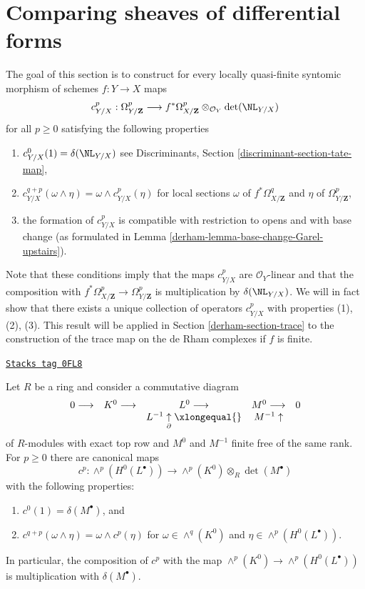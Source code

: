 \section{Comparing sheaves of differential forms}
\label{derham-section-quasi-finite-syntomic}
The goal of this section is to construct for every locally quasi-finite
syntomic morphism of schemes $f : Y \to X$ maps
$$
c^p_{Y/X} :
\Omega^p_{Y/\mathbf{Z}}
\longrightarrow
f^*\Omega^p_{X/\mathbf{Z}} \otimes_{\mathcal{O}_Y} \det(\NL_{Y/X})
$$
for all $p \geq 0$ satisfying the following properties
\begin{enumerate}
\item
\label{derham-item-degree-zero}
$c_{Y/X}^0(1) = \delta(\NL_{Y/X})$ see
Discriminants, Section \ref{discriminant-section-tate-map},
\item
\label{derham-item-multiplicative}
$c_{Y/X}^{q + p}(\omega \wedge \eta) = \omega \wedge c_{Y/X}^p(\eta)$
for local sections $\omega$ of $f^*\Omega^q_{X/\mathbf{Z}}$
and $\eta$ of $\Omega^p_{Y/\mathbf{Z}}$,
\item
\label{derham-item-base-change}
the formation of $c^p_{Y/X}$ is compatible with restriction to opens
and with base change
(as formulated in Lemma \ref{derham-lemma-base-change-Garel-upstairs}).
\end{enumerate}
Note that these conditions imply that the maps $c^p_{Y/X}$ are
$\mathcal{O}_Y$-linear and that the composition with
$f^*\Omega^p_{X/\mathbf{Z}} \to \Omega^p_{Y/\mathbf{Z}}$
is multiplication by $\delta(\NL_{Y/X})$.
We will in fact show that there exists a unique collection of operators
$c^p_{Y/X}$ with properties (1), (2), (3). This result will be applied in
Section \ref{derham-section-trace} to the construction of the trace map on
the de Rham complexes if $f$ is finite.

\begin{lemma}
\label{derham-lemma-funny-map}
\href{https://stacks.math.columbia.edu/tag/0FL8}{\texttt{Stacks tag 0FL8}}

Let $R$ be a ring and consider a commutative diagram
$$
\begin{array}{ccccc}0 \longrightarrow & K^0 \longrightarrow & L^0 \longrightarrow & M^0 \longrightarrow & 0 \\  &  & L^{-1} \underset{\partial}{\uparrow}\xlongequal{} & M^{-1} \uparrow & \end{array}
$$
of $R$-modules with exact top row and $M^0$ and $M^{-1}$
finite free of the same rank. For $p \geq 0$ there are canonical maps
$$
c^p :
\wedge^p(H^0(L^\bullet))
\longrightarrow
\wedge^p(K^0) \otimes_R \det(M^\bullet)
$$
with the following properties:
\begin{enumerate}
\item $c^0(1) = \delta(M^\bullet)$, and
\item $c^{q + p}(\omega \wedge \eta) = \omega \wedge c^p(\eta)$
for $\omega \in \wedge^q(K^0)$ and $\eta \in \wedge^p(H^0(L^\bullet))$.
\end{enumerate}
In particular, the composition of $c^p$ with the map
$\wedge^p(K^0) \to \wedge^p(H^0(L^\bullet))$ is multiplication
with $\delta(M^\bullet)$.
\end{lemma}

